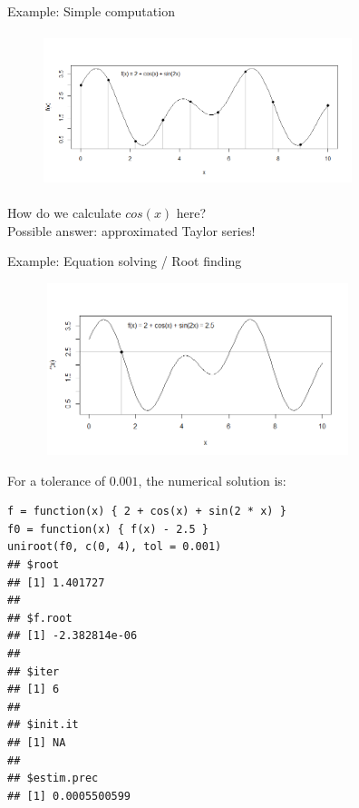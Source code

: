 \documentclass[11pt,compress,t,notes=noshow, xcolor=table]{beamer}
\begin{document}
\begin{vbframe}{Example: Simple computation}

\begin{center}
\begin{figure}
  \includegraphics[height = 4.5cm, width = 9cm]{figure_man/simple-comp.png}
\end{figure}
\end{center}

How do we calculate $cos(x)$ here?\\
Possible answer: approximated Taylor series!

\end{vbframe}

\begin{vbframe}{Example: Equation solving / Root finding}

\begin{center}
\begin{figure}
  \includegraphics[height = 5cm, width = 9cm]{figure_man/Equation-solving.png}
\end{figure}
\end{center}

\framebreak

For a tolerance of $0.001$, the numerical solution is:

\footnotesize
\begin{verbatim}
f = function(x) { 2 + cos(x) + sin(2 * x) }
f0 = function(x) { f(x) - 2.5 }
uniroot(f0, c(0, 4), tol = 0.001)
## $root
## [1] 1.401727
##
## $f.root
## [1] -2.382814e-06
##
## $iter
## [1] 6
##
## $init.it
## [1] NA
##
## $estim.prec
## [1] 0.0005500599
\end{verbatim}


\end{vbframe}
\end{document}
